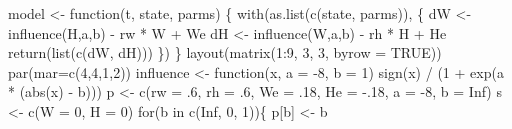 \documentclass[
  a4paper,
  DIV=11,
  numbers=noendperiod,
  oneside]{scrreprt}
\newenvironment{Shaded}{}{}
\newcommand{\AttributeTok}[1]{\textcolor[rgb]{0.84,0.23,0.29}{#1}}
\newcommand{\ConstantTok}[1]{\textcolor[rgb]{0.00,0.36,0.77}{#1}}
\newcommand{\ControlFlowTok}[1]{\textcolor[rgb]{0.84,0.23,0.29}{#1}}
\newcommand{\DecValTok}[1]{\textcolor[rgb]{0.00,0.36,0.77}{#1}}
\newcommand{\FunctionTok}[1]{\textcolor[rgb]{0.44,0.26,0.76}{#1}}
\newcommand{\NormalTok}[1]{\textcolor[rgb]{0.14,0.16,0.18}{#1}}
\newcommand{\OtherTok}[1]{\textcolor[rgb]{0.44,0.26,0.76}{#1}}
\newcommand{\SpecialCharTok}[1]{\textcolor[rgb]{0.00,0.36,0.77}{#1}}
\newcommand{\StringTok}[1]{\textcolor[rgb]{0.01,0.18,0.38}{#1}}
\begin{document}
\begin{Shaded}
\begin{Highlighting}[]
\NormalTok{model }\OtherTok{\textless{}{-}} \ControlFlowTok{function}\NormalTok{(t, state, parms) \{}
  \FunctionTok{with}\NormalTok{(}\FunctionTok{as.list}\NormalTok{(}\FunctionTok{c}\NormalTok{(state, parms)), \{}
\NormalTok{    dW }\OtherTok{\textless{}{-}} \FunctionTok{influence}\NormalTok{(H,a,b) }\SpecialCharTok{{-}}\NormalTok{ rw }\SpecialCharTok{*}\NormalTok{ W }\SpecialCharTok{+}\NormalTok{ We}
\NormalTok{    dH }\OtherTok{\textless{}{-}} \FunctionTok{influence}\NormalTok{(W,a,b) }\SpecialCharTok{{-}}\NormalTok{ rh }\SpecialCharTok{*}\NormalTok{ H }\SpecialCharTok{+}\NormalTok{ He}
    \FunctionTok{return}\NormalTok{(}\FunctionTok{list}\NormalTok{(}\FunctionTok{c}\NormalTok{(dW, dH)))}
\NormalTok{  \})}
\NormalTok{\}}
\FunctionTok{layout}\NormalTok{(}\FunctionTok{matrix}\NormalTok{(}\DecValTok{1}\SpecialCharTok{:}\DecValTok{9}\NormalTok{, }\DecValTok{3}\NormalTok{, }\DecValTok{3}\NormalTok{, }\AttributeTok{byrow =} \ConstantTok{TRUE}\NormalTok{))}
\FunctionTok{par}\NormalTok{(}\AttributeTok{mar=}\FunctionTok{c}\NormalTok{(}\DecValTok{4}\NormalTok{,}\DecValTok{4}\NormalTok{,}\DecValTok{1}\NormalTok{,}\DecValTok{2}\NormalTok{))}
\NormalTok{influence }\OtherTok{\textless{}{-}} \ControlFlowTok{function}\NormalTok{(x, }\AttributeTok{a =} \SpecialCharTok{{-}}\DecValTok{8}\NormalTok{, }\AttributeTok{b =} \DecValTok{1}\NormalTok{)}
  \FunctionTok{sign}\NormalTok{(x) }\SpecialCharTok{/}\NormalTok{ (}\DecValTok{1} \SpecialCharTok{+} \FunctionTok{exp}\NormalTok{(a }\SpecialCharTok{*}\NormalTok{ (}\FunctionTok{abs}\NormalTok{(x) }\SpecialCharTok{{-}}\NormalTok{ b)))}
\NormalTok{p }\OtherTok{\textless{}{-}} \FunctionTok{c}\NormalTok{(}\AttributeTok{rw =}\NormalTok{ .}\DecValTok{6}\NormalTok{, }\AttributeTok{rh =}\NormalTok{ .}\DecValTok{6}\NormalTok{, }\AttributeTok{We =}\NormalTok{ .}\DecValTok{18}\NormalTok{, }\AttributeTok{He =} \SpecialCharTok{{-}}\NormalTok{.}\DecValTok{18}\NormalTok{, }\AttributeTok{a =} \SpecialCharTok{{-}}\DecValTok{8}\NormalTok{, }\AttributeTok{b =} \ConstantTok{Inf}\NormalTok{)}
\NormalTok{s }\OtherTok{\textless{}{-}} \FunctionTok{c}\NormalTok{(}\AttributeTok{W =} \DecValTok{0}\NormalTok{, }\AttributeTok{H =} \DecValTok{0}\NormalTok{)}
\ControlFlowTok{for}\NormalTok{(b }\ControlFlowTok{in} \FunctionTok{c}\NormalTok{(}\ConstantTok{Inf}\NormalTok{, }\DecValTok{0}\NormalTok{, }\DecValTok{1}\NormalTok{))\{}
\NormalTok{  p[}\StringTok{\textquotesingle{}b\textquotesingle{}}\NormalTok{] }\OtherTok{\textless{}{-}}\NormalTok{ b}

\end{Highlighting}
\end{Shaded}
\end{document}
